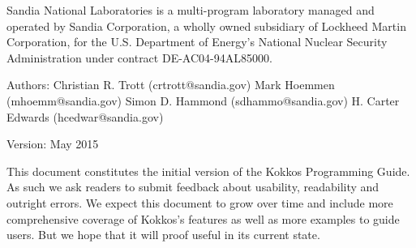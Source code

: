 \documentclass[a4paper,11pt]{book}
\begin{document}

\noindent
Sandia National Laboratories is a multi-program laboratory managed and operated by Sandia 
Corporation, a wholly owned subsidiary of Lockheed Martin Corporation, for the U.S. 
Department of Energy's National Nuclear Security Administration under contract DE-AC04-94AL85000.

\vspace{4cm}
\noindent 
Authors: \newline\newline
Christian R. Trott (crtrott@sandia.gov)\newline
Mark Hoemmen (mhoemm@sandia.gov)\newline
Simon D. Hammond (sdhammo@sandia.gov)\newline
H. Carter Edwards (hcedwar@sandia.gov)

\vspace{1cm}
\noindent 
Version: \newline{} May 2015 \newline\newline

\noindent
This document constitutes the initial version of the Kokkos Programming Guide. 
As such we ask readers to submit feedback about usability, readability and outright errors. 
We expect this document to grow over time and include more comprehensive coverage of 
Kokkos's features as well as more examples to guide users. 
But we hope that it will proof useful in its current state. 

\tableofcontents












\clearpage


%
\end{document}
